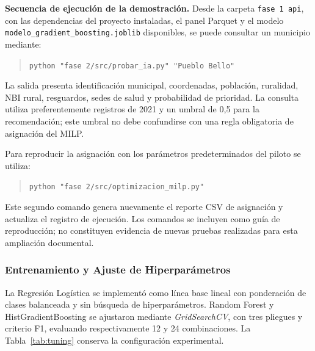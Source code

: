 \documentclass[12pt]{article}
\begin{document}
\textbf{Secuencia de ejecución de la demostración.} Desde la carpeta \texttt{fase 1 api}, con las dependencias del proyecto instaladas, el panel Parquet y el modelo \texttt{modelo\_\allowbreak gradient\_\allowbreak boosting.joblib} disponibles, se puede consultar un municipio mediante:

\begin{quote}
\small
\verb|python "fase 2/src/probar_ia.py" "Pueblo Bello"|
\end{quote}

La salida presenta identificación municipal, coordenadas, población, ruralidad, NBI rural, resguardos, sedes de salud y probabilidad de prioridad. La consulta utiliza preferentemente registros de 2021 y un umbral de 0,5 para la recomendación; este umbral no debe confundirse con una regla obligatoria de asignación del MILP.

Para reproducir la asignación con los parámetros predeterminados del piloto se utiliza:

\begin{quote}
\small
\verb|python "fase 2/src/optimizacion_milp.py"|
\end{quote}

Este segundo comando genera nuevamente el reporte CSV de asignación y actualiza el registro de ejecución. Los comandos se incluyen como guía de reproducción; no constituyen evidencia de nuevas pruebas realizadas para esta ampliación documental.

\subsubsection{Entrenamiento y Ajuste de Hiperparámetros}
La Regresión Logística se implementó como línea base lineal con ponderación de clases balanceada y sin búsqueda de hiperparámetros. Random Forest y HistGradientBoosting se ajustaron mediante \textit{GridSearchCV}, con tres pliegues y criterio F1, evaluando respectivamente 12 y 24 combinaciones. La Tabla~\ref{tab:tuning} conserva la configuración experimental.
\end{document}
